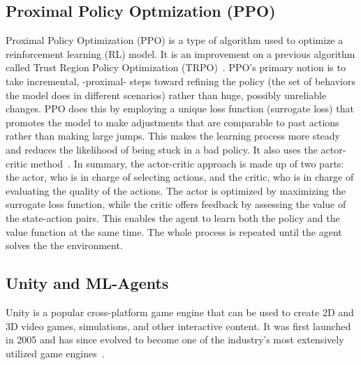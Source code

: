 \subsection{Proximal Policy Optmization (PPO)}\label{subsec:proximal-policy-optmization-(ppo)}
Proximal Policy Optimization (PPO) is a type of algorithm used to optimize a reinforcement learning (RL) model.
It is an improvement on a previous algorithm called Trust Region Policy Optimization (TRPO)~\cite{schulman_proximal_2017}.
PPO's primary notion is to take incremental, -proximal- steps toward refining the policy (the set of behaviors the model does in different scenarios) rather than huge, possibly unreliable changes.
PPO does this by employing a unique loss function (surrogate loss) that promotes the model to make adjustments that are comparable to past actions rather than making large jumps.
This makes the learning process more steady and reduces the likelihood of being stuck in a bad policy.
It also uses the actor-critic method~\cite{konda_onactor-critic_2003}.
In summary, the actor-critic approach is made up of two parts: the actor, who is in charge of selecting actions, and the critic, who is in charge of evaluating the quality of the actions.
The actor is optimized by maximizing the surrogate loss function, while the critic offers feedback by assessing the value of the state-action pairs.
This enables the agent to learn both the policy and the value function at the same time.
The whole process is repeated until the agent solves the the environment.

\subsection{Unity and ML-Agents}\label{subsec:unity-and-ml-agents}
Unity is a popular cross-platform game engine that can be used to create 2D and 3D video games, simulations, and other interactive content.
It was first launched in 2005 and has since evolved to become one of the industry's most extensively utilized game engines~\cite{Haas2014AHO}.


